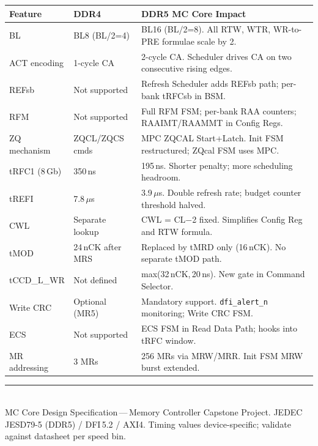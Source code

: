 \documentclass[10pt,a4paper]{article}
\newcommand{\Th}[1]{\cellcolor{thbg}\textbf{\small\color{acc1}#1}}
\newcommand{\RA}{\rowcolor{white}}
\newcommand{\RB}{\rowcolor{altbg}}
\begin{document}
\begin{center}
\begin{tabularx}{\linewidth}{@{} l l X @{}}
\toprule
\Th{Feature} & \Th{DDR4} & \Th{DDR5 MC Core Impact} \\
\midrule
\RA BL              & BL8 (BL/2=4)      & BL16 (BL/2=8). All RTW, WTR, WR-to-PRE formulae scale by 2. \\
\RB ACT encoding    & 1-cycle CA        & 2-cycle CA. Scheduler drives CA on two consecutive rising edges. \\
\RA REFsb           & Not supported     & Refresh Scheduler adds REFsb path; per-bank tRFCsb in BSM. \\
\RB RFM             & Not supported     & Full RFM FSM; per-bank RAA counters; RAAIMT/RAAMMT in Config Regs. \\
\RA ZQ mechanism    & ZQCL/ZQCS cmds   & MPC ZQCAL Start+Latch. Init FSM restructured; ZQcal FSM uses MPC. \\
\RB tRFC1 (8\,Gb)   & 350\,ns           & 195\,ns. Shorter penalty; more scheduling headroom. \\
\RA tREFI           & 7.8\,$\mu$s       & 3.9\,$\mu$s. Double refresh rate; budget counter threshold halved. \\
\RB CWL             & Separate lookup   & CWL = CL$-$2 fixed. Simplifies Config Reg and RTW formula. \\
\RA tMOD            & 24\,nCK after MRS & Replaced by tMRD only (16\,nCK). No separate tMOD path. \\
\RB tCCD\_L\_WR     & Not defined       & max(32\,nCK,\,20\,ns). New gate in Command Selector. \\
\RA Write CRC       & Optional (MR5)    & Mandatory support. \texttt{dfi\_alert\_n} monitoring; Write CRC FSM. \\
\RB ECS             & Not supported     & ECS FSM in Read Data Path; hooks into tRFC window. \\
\RA MR addressing   & 3 MRs             & 256 MRs via MRW/MRR. Init FSM MRW burst extended. \\
\bottomrule
\end{tabularx}
\end{center}

\vspace{10pt}
\noindent\color{acc1!40}\rule{\linewidth}{0.5pt}\\[2pt]
{\small\color{notetext}
MC Core Design Specification\,---\,Memory Controller Capstone Project.
JEDEC JESD79-5 (DDR5) / DFI\,5.2 / AXI4.
Timing values device-specific; validate against datasheet per speed bin.}
\end{document}

